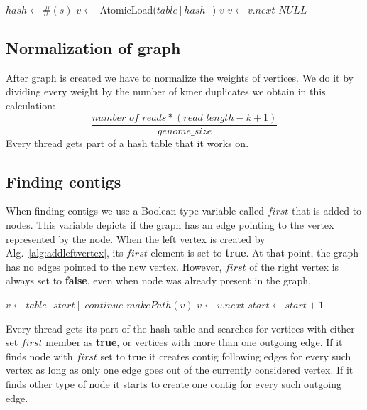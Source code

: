 \documentclass[12pt]{article}
\begin{document}
\begin{algorithm}[!htb]
\begin{algorithmic}[1]
\State $hash\gets \#(s)$
\State $v \gets$ AtomicLoad($table[hash]$)
\State \Return $v$
\EndIf
\State $v \gets v.next$
\EndWhile
\State \Return $NULL$
\EndFunction
\end{algorithmic}
\caption{Finding vertex}
\label{alg:findvertex}
\end{algorithm}

\subsection{Normalization of graph}
After graph is created we have to normalize the weights of vertices. We do it by dividing every weight by the number of kmer duplicates we obtain in this calculation:
\[
\frac{number\_of\_reads * (read\_length -k +1)}{genome\_size}
\]
Every thread gets part of a hash table that it works on.
\subsection{Finding contigs}

When finding contigs we use a Boolean type variable called $first$ that is added to nodes. This variable depicts if the graph has an edge pointing to the vertex represented by the node. When the left vertex is created by Alg.~\ref{alg:addleftvertex}, its $first$ element is set to \textbf{true}. At that point, the graph has no edges pointed to the new vertex. However, $first$ of the right vertex is always set to \textbf{false}, even when node was already present in the graph.
\begin{algorithm}[!htb]
\begin{algorithmic}[1]
\State $v \gets table[start]$
\State $continue$
\EndIf
{}
\State $makePath(v)$
\EndIf
\State $v \gets v.next$
\EndWhile
\State $start \gets start + 1$
\EndWhile
\EndFunction
\end{algorithmic}
\caption{Finding contigs}
\label{alg:findcontigs}
\end{algorithm}
Every thread gets its part of the hash table and searches for vertices with either set $first$ member as \textbf{true}, or vertices with more than one outgoing edge.
If it finds node with $first$ set to true it creates contig following edges for every such vertex as long as only one edge goes out of the currently considered vertex.
If it finds other type of node it starts to create one contig for every such outgoing edge.
\end{document}
